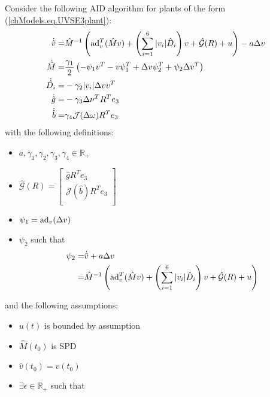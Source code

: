 \begin{UV_SE3_AID}
\label{chUV_AID.theo.UV_SE3_AID}


Consider the following \ac{AID} algorithm for plants of the form
(\ref{chModels.eq.UVSE3plant}):
%
\begin{align}
  \dot{\hat{v}}=&\hat{M}^{-1}\left(\operatorname{ad}_v^T(\hat{M}v)
  +\left(\sum_{i=1}^6 |v_i|\hat{D}_i\right) v + 
  \hat{\mathcal{G}}(R)+u\right) - a \Delta v   \label{chUV_AID.eq.UV_SE3_Estimator}\\
  \dot{\hat{M}}=&\frac{\gamma_1}{2}\left(-\psi_1 v^T 
    -v \psi_1^T+\Delta v \psi_2^T
  +\psi_2 \Delta v^T\right)\label{chUV_AID.eq.UV_SE3_MassId}\\
  \dot{\hat{D_i}}=&-\gamma_2|v_i|\Delta v v^T
  \label{chUV_AID.eq.UV_SE3_DragId}\\
   \dot{\hat{g}}=&-\gamma_3 \Delta \nu^T R^T e_3
  \label{chUV_AID.eq.UV_SE3_GravId} \\
   \dot{\hat{b}}=&\gamma_4\mathcal{J}(\Delta \omega) R^T e_3
  \label{chUV_AID.eq.UV_SE3_BuoyId} 
\end{align}
%
\noindent with the following definitions:
%
\begin{itemize}
\item $a,\gamma_1,\gamma_2,\gamma_3,\gamma_4\in\mathbb{R}_+$
\item $\hat{\mathcal{G}}(R)= \left[ \begin{array}{c}\hat{g} R^T e_3   
    \\ \mathcal{J}(\hat{b})R^T e_3 \\ \end{array}\right]$
\item $\psi_1=\operatorname{ad}_v(\Delta v)$
\item $\psi_2$ such that
\begin{align}
\psi_2=&\dot{\hat{v}}+a \Delta v \nonumber \\
       = &\hat{M}^{-1}\left(\operatorname{ad}_v^T(\hat{M}v)
  +\left(\sum_{i=1}^6 |v_i|\hat{D}_i\right) v + 
  \hat{\mathcal{G}}(R)+u\right)
\end{align}
\end{itemize}
%
\noindent and the following assumptions:
%
\begin{itemize}
\item $u(t)$ is bounded by assumption
\item $\hat{M}(t_0)$ is \ac{SPD}
\item $\hat{v}(t_0)=v(t_0)$
\item $\exists \epsilon \in \mathbb{R}_+$ such that 

\end{itemize}
\end{UV_SE3_AID}
